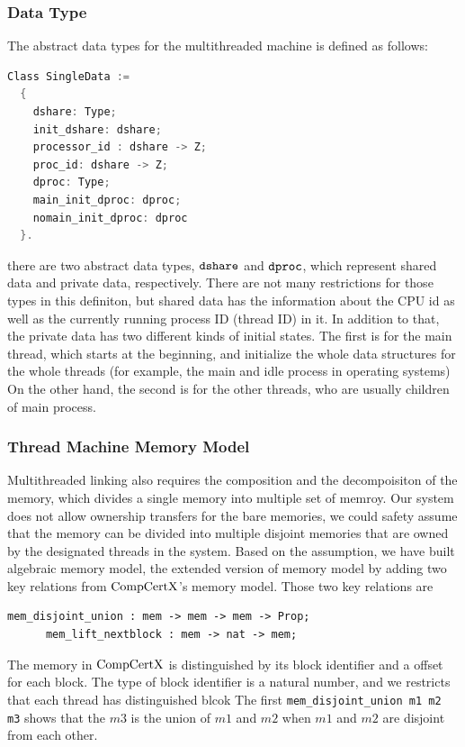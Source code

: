 \subsubsection{Data Type} 
The abstract data types for the multithreaded machine is defined as follows:
\begin{lstlisting}[language=C]
Class SingleData :=
  {
    dshare: Type;
    init_dshare: dshare;
    processor_id : dshare -> Z;
    proc_id: dshare -> Z;
    dproc: Type;
    main_init_dproc: dproc;
    nomain_init_dproc: dproc
  }.
\end{lstlisting} 
there are two abstract data types, ${\mathrm{\texttt{dshare}}}$ and ${\mathrm{\texttt{dproc}}}$, 
which represent shared data and private data, respectively. 
There are not many restrictions for those types in this definiton, 
but shared data has the information about the CPU id as well as the currently running process ID (thread ID) in it. 
In addition to that, 
the private data has two different kinds of initial states. 
The first is for the main thread, which starts at the beginning, 
and initialize the whole data structures for the whole  threads (for example, the main and idle process 
in operating systems)
On the other hand, the second is for the other threads, 
who are usually children of main process. 

\subsubsection{Thread Machine Memory Model}


Multithreaded linking also requires the composition and the decompoisiton of the memory,
which divides a single memory into multiple set of memroy. 
Our system does not allow ownership transfers for the bare memories, 
we could safety assume that the memory can be divided into 
multiple disjoint memories that are owned by the designated threads in the system. 
Based on the assumption, 
we have built algebraic memory model, the extended version of memory model by adding two key relations from $\mathrm{CompCertX}$'s memory model.
Those two key relations are 
\begin{lstlisting}[language=Caml]
      mem_disjoint_union : mem -> mem -> mem -> Prop;
      mem_lift_nextblock : mem -> nat -> mem;
\end{lstlisting}
The memory in $\mathrm{CompCertX}$ is 
distinguished by its block identifier and a offset for each block. 
The type of block identifier is a natural number,
and we restricts that each thread has distinguished blcok  
The first \lstinline$mem_disjoint_union m1 m2 m3$  shows that 
the $m3$ is the union of $m1$ and $m2$ when $m1$ and $m2$ 
are disjoint from each other. 

